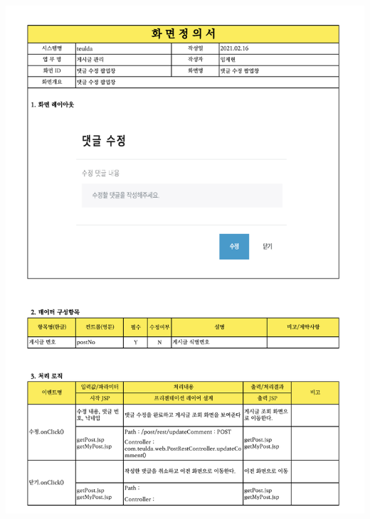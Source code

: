 {{{{{{{{{{{{{{{{{{{{{{{{{{{{{{{{{{{{{{{{{{{{{{{{{{{{{{{{{{{{{{{{{{{\includegraphics[width=19cm]{./Figure/Design/Display/post/post_15.pdf} \\
}}}}}}}}}}}}}}}}}}}}}}}}}}}}}}}}}}}}}}}}}}}}}}}}}}}}}}}}}}}}}}}}}}}
